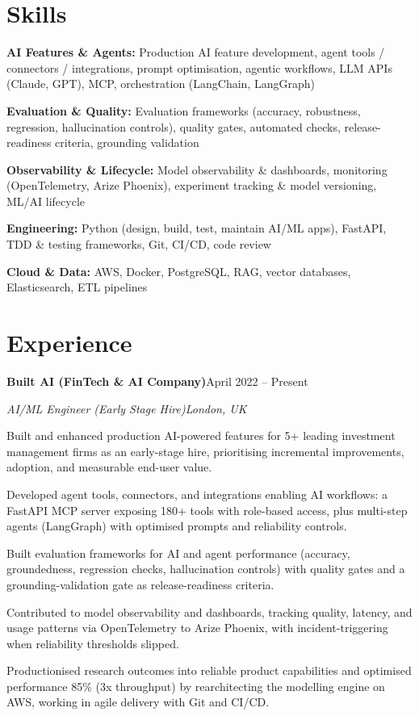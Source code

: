 \documentclass[10pt,a4paper]{article}
\newcommand{\entry}[4]{%
  {\color{company}\bfseries #1}\hfill {\color{muted}#2}\par
  \vspace{1pt}
  {\itshape #3}\hfill {\color{muted}\itshape #4}\par
  \vspace{3pt}%
}
\begin{document}
\section{Skills}
\begin{tight}
  \item[\textcolor{accent}{\small$\bullet$}] \textbf{AI Features \& Agents:} Production AI feature development, agent tools / connectors / integrations, prompt optimisation, agentic workflows, LLM APIs (Claude, GPT), MCP, orchestration (LangChain, LangGraph)
  \item[\textcolor{accent}{\small$\bullet$}] \textbf{Evaluation \& Quality:} Evaluation frameworks (accuracy, robustness, regression, hallucination controls), quality gates, automated checks, release-readiness criteria, grounding validation
  \item[\textcolor{accent}{\small$\bullet$}] \textbf{Observability \& Lifecycle:} Model observability \& dashboards, monitoring (OpenTelemetry, Arize Phoenix), experiment tracking \& model versioning, ML/AI lifecycle
  \item[\textcolor{accent}{\small$\bullet$}] \textbf{Engineering:} Python (design, build, test, maintain AI/ML apps), FastAPI, TDD \& testing frameworks, Git, CI/CD, code review
  \item[\textcolor{accent}{\small$\bullet$}] \textbf{Cloud \& Data:} AWS, Docker, PostgreSQL, RAG, vector databases, Elasticsearch, ETL pipelines
\end{tight}

\section{Experience}
\entry{Built AI (FinTech \& AI Company)}{April 2022 -- Present}{AI/ML Engineer (Early Stage Hire)}{London, UK}
\begin{tight}
  \item Built and enhanced production AI-powered features for 5+ leading investment management firms as an early-stage hire, prioritising incremental improvements, adoption, and measurable end-user value.
  \item Developed agent tools, connectors, and integrations enabling AI workflows: a FastAPI MCP server exposing 180+ tools with role-based access, plus multi-step agents (LangGraph) with optimised prompts and reliability controls.
  \item Built evaluation frameworks for AI and agent performance (accuracy, groundedness, regression checks, hallucination controls) with quality gates and a grounding-validation gate as release-readiness criteria.
  \item Contributed to model observability and dashboards, tracking quality, latency, and usage patterns via OpenTelemetry to Arize Phoenix, with incident-triggering when reliability thresholds slipped.
  \item Productionised research outcomes into reliable product capabilities and optimised performance 85\% (3x throughput) by rearchitecting the modelling engine on AWS, working in agile delivery with Git and CI/CD.
\end{tight}
\end{document}
